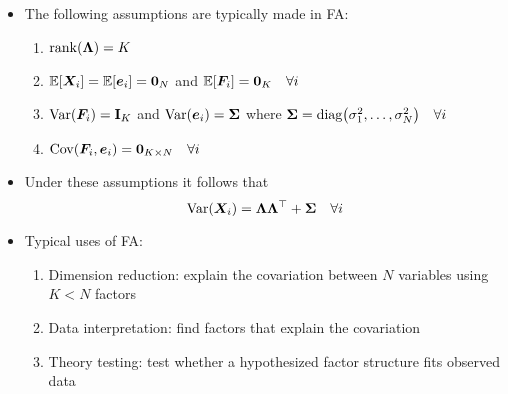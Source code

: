 \documentclass[10pt, compress, notheorems, aspectratio=169]{beamer}
\let\originalleft\left
\let\originalright\right
\renewcommand{\left}{\mathopen{}\mathclose \bgroup \originalleft}
\renewcommand{\right}{\aftergroup \egroup \originalright}
\newcommand{\E}{\mathbb{E}}
\newcommand{\Var}{\mathrm{Var}}
\newcommand{\Cov}{\mathrm{Cov}}
\DeclareMathOperator{\rank}{rank}
\begin{document}
\begin{frame}
	\begin{itemize}
		\item The following assumptions are typically made in FA:			
			\begin{enumerate}
				\item $\rank \left( {\bm \Lambda} \right) = K$ 
				\item $\E \left[ {\bm X}_i \right] = \E \left[ {\bm e_i} \right] ={\bf 0}_N$ and $\E \left[ {\bm F_i} \right] ={\bf 0}_K \quad \forall i$
				\item $\Var \left( {\bm F}_i \right) = {\bf I}_K$ and $\Var \left( {\bm e}_i \right) = {\bm \Sigma}$ where ${\bm \Sigma} = \text{diag} \left( \sigma_1^2, \ldots, \sigma_N^2 \right) \quad \forall i$
				\item $\Cov \left( {\bm F}_i, {\bm e}_i \right) = {\bf 0}_{K \times N} \quad \forall i$
			\end{enumerate}
		\item Under these assumptions it follows that 
			\begin{equation*}
				\Var \left( {\bm X}_i \right)= {\bm \Lambda} {\bm \Lambda}^{\top} + {\bm \Sigma} \quad \forall i
			\end{equation*}
		\item Typical uses of FA:
			\begin{enumerate}
				\item Dimension reduction: explain the covariation between $N$ variables using $K < N$ factors
				\item Data interpretation: find factors that explain the covariation
				\item Theory testing: test whether a hypothesized factor structure fits observed data
			\end{enumerate}
	\end{itemize}
\end{frame}
\end{document}
